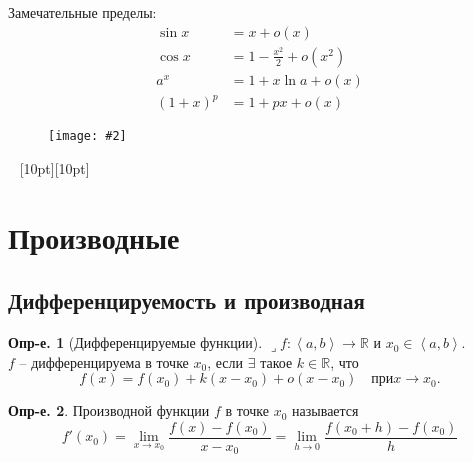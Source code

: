 \documentclass[a4paper,12pt]{article}
\numberwithin{figure}{section}
\theoremstyle{definition}
\newtheorem{definition}{Опр-е.}[section]
\theoremstyle{definition}
\def\RR{\mathbb{R}}
\def\on{\!:}
\def\intab{\left<a,b\right>}
\def\lets{{\huge$\lrcorner$}\space}
\def\vignette{\vspace{48pt} \noindent \hrulefill~ \raisebox{-8pt}[10pt][10pt]{\Huge\ding{102}}~ \hrulefill}
\newcommand\CenterFigure[2]{
	\begin{figure}[H]
		\centering
		\texttt{[image: \#2]}
	\end{figure}
}
\begin{document}
\medskip
Замечательные пределы:
\begin{align*}
	   \sin x &= x + o(x)
	\\ \cos x &= 1 - \frac{x^2}2 + o(x^2)
	\\ a^x &= 1 + x \ln a + o(x)
	\\ (1+x)^p &= 1 + px + o(x)
\end{align*}

\CenterFigure{\linewidth}{small-o-test-1.png}


\vignette
\section{Производные}


\subsection{Дифференцируемость и производная}


\begin{definition}[Дифференцируемые функции]
	\lets $f\on\intab\to\RR$ и $x_0\in\intab$. \\
	$f$ -- дифференцируема в точке $x_0$, если $\exists$ такое $k\in\RR$, что
	\[ f(x) = f(x_0) + k(x-x_0) + o(x-x_0) \quad при x \to x_0. \]
\end{definition}


\begin{definition}
	Производной функции $f$ в точке $x_0$ называется
	\[ f'(x_0) = \lim_{x\to x_0}\frac{f(x)-f(x_0)}{x-x_0}
			   = \lim_{h\to 0}\frac{f(x_0+h)-f(x_0)}h \]
\end{definition}
\bigskip
\end{document}
